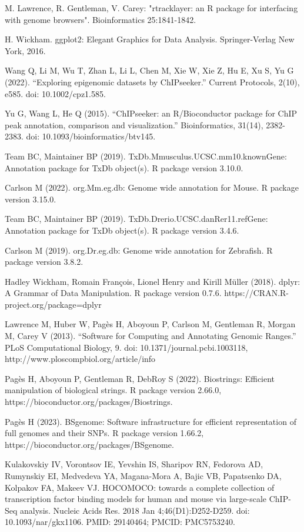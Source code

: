 \documentclass[12pt]{article}
\begin{document}
\begin{thebibliography}{99}
 M. Lawrence, R. Gentleman, V. Carey: "rtracklayer: an {R}
package for interfacing with genome browsers". Bioinformatics 25:1841-1842.

 H. Wickham. ggplot2: Elegant Graphics for Data Analysis.
Springer-Verlag New York, 2016.

 Wang Q, Li M, Wu T, Zhan L, Li L, Chen M, Xie W, Xie Z, Hu E,
Xu S, Yu G (2022). “Exploring epigenomic datasets by ChIPseeker.” Current
Protocols, 2(10), e585. doi: 10.1002/cpz1.585.

 Yu G, Wang L, He Q (2015). “ChIPseeker: an R/Bioconductor
package for ChIP peak annotation, comparison and visualization.”
Bioinformatics, 31(14), 2382-2383. doi: 10.1093/bioinformatics/btv145.

 Team BC, Maintainer BP (2019).
TxDb.Mmusculus.UCSC.mm10.knownGene: Annotation package for TxDb object(s).
R package version 3.10.0.

 Carlson M (2022). org.Mm.eg.db: Genome wide annotation for
Mouse. R package version 3.15.0.

 Team BC, Maintainer BP (2019).
TxDb.Drerio.UCSC.danRer11.refGene: Annotation package for TxDb object(s).
R package version 3.4.6.

 Carlson M (2019). org.Dr.eg.db: Genome wide annotation for
Zebrafish. R package version 3.8.2.

 Hadley Wickham, Romain François, Lionel Henry and Kirill Müller
(2018). dplyr: A Grammar of Data Manipulation. R package version 0.7.6.
https://CRAN.R-project.org/package=dplyr

 Lawrence M, Huber W, Pagès H, Aboyoun P, Carlson M,
Gentleman R, Morgan M, Carey V (2013). “Software for Computing and Annotating
Genomic Ranges.” PLoS Computational Biology, 9.
doi: 10.1371/journal.pcbi.1003118,
http://www.ploscompbiol.org/article/info%

 Pagès H, Aboyoun P, Gentleman R, DebRoy S (2022).
Biostrings: Efficient manipulation of biological strings. R package version
2.66.0, https://bioconductor.org/packages/Biostrings.

 Pagès H (2023). BSgenome: Software infrastructure for
efficient representation of full genomes and their SNPs. R package version
1.66.2, https://bioconductor.org/packages/BSgenome.

 Kulakovskiy IV, Vorontsov IE, Yevshin IS, Sharipov RN,
Fedorova AD, Rumynskiy EI, Medvedeva YA, Magana-Mora A, Bajic VB, Papatsenko DA,
Kolpakov FA, Makeev VJ. HOCOMOCO: towards a complete collection of transcription
factor binding models for human and mouse via large-scale ChIP-Seq analysis.
Nucleic Acids Res. 2018 Jan 4;46(D1):D252-D259. doi: 10.1093/nar/gkx1106.
PMID: 29140464; PMCID: PMC5753240.


\end{thebibliography}
\end{document}
